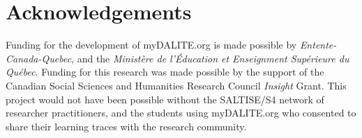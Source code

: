 \documentclass[notitlepage,12pt]{jedm}
\begin{document}
\section{Acknowledgements}
Funding for the development of myDALITE.org is made possible by 
\textit{Entente-Canada-Quebec}, and the \textit{Ministère de l'Éducation et 
Enseignment Supérieure du Québec}. Funding for this research was made possible 
by the support of the Canadian Social Sciences and Humanities Research Council 
\textit{Insight} Grant. This project would not have been possible without the 
SALTISE/S4 network of researcher practitioners, and the students using 
myDALITE.org who consented to share their learning traces with the research 
community.

 




\end{document}
